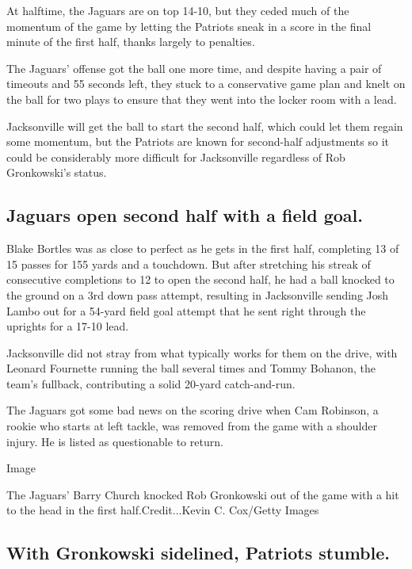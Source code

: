 At halftime, the Jaguars are on top 14-10, but they ceded much of the
momentum of the game by letting the Patriots sneak in a score in the
final minute of the first half, thanks largely to penalties.

The Jaguars' offense got the ball one more time, and despite having a
pair of timeouts and 55 seconds left, they stuck to a conservative game
plan and knelt on the ball for two plays to ensure that they went into
the locker room with a lead.

Jacksonville will get the ball to start the second half, which could let
them regain some momentum, but the Patriots are known for second-half
adjustments so it could be considerably more difficult for Jacksonville
regardless of Rob Gronkowski's status.

\hypertarget{jaguars-open-second-half-with-a-field-goal}{%
\subsection{Jaguars open second half with a field
goal.}\label{jaguars-open-second-half-with-a-field-goal}}

Blake Bortles was as close to perfect as he gets in the first half,
completing 13 of 15 passes for 155 yards and a touchdown. But after
stretching his streak of consecutive completions to 12 to open the
second half, he had a ball knocked to the ground on a 3rd down pass
attempt, resulting in Jacksonville sending Josh Lambo out for a 54-yard
field goal attempt that he sent right through the uprights for a 17-10
lead.

Jacksonville did not stray from what typically works for them on the
drive, with Leonard Fournette running the ball several times and Tommy
Bohanon, the team's fullback, contributing a solid 20-yard
catch-and-run.

The Jaguars got some bad news on the scoring drive when Cam Robinson, a
rookie who starts at left tackle, was removed from the game with a
shoulder injury. He is listed as questionable to return.

Image

The Jaguars' Barry Church knocked Rob Gronkowski out of the game with a
hit to the head in the first half.Credit...Kevin C. Cox/Getty Images

\hypertarget{with-gronkowski-sidelined-patriots-stumble}{%
\subsection{With Gronkowski sidelined, Patriots
stumble.}\label{with-gronkowski-sidelined-patriots-stumble}}

